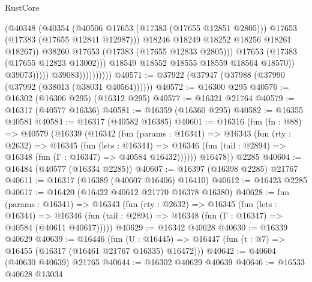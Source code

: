 \begin{lexlean}{RustCore}
\begin{coremodule}
                                            (@40348
                                              (@40354
                                                (@40506 @17653 (@17383 (@17655 @12851 @2805)))
                                                @17653
                                                (@17383 (@17655 @12841 @12987)))
                                              @18246
                                              @18249
                                              @18252
                                              @18256
                                              @18261
                                              @18267))
                                          @38260
                                          @17653
                                          (@17383 (@17655 @12833 @2805)))
                                        @17653
                                        (@17383 (@17655 @12823 @13002)))
                                      @18549
                                      @18552
                                      @18555
                                      @18559
                                      @18564
                                      @18570))
                                  @39073)))))
                        @39083))))))))))
@40571 := @37922 (@37947 (@37988 (@37990 (@37992 (@38013 (@38031 @40564))))))
@40572 := @16300 @295
@40576 := @16302 (@16306 @295) (@16312 @295)
@40577 := @16321 @21764
@40579 := @16317 (@40577 @16336)
@40581 := @16359 (@16360 @295)
@40582 := @16355 @40581
@40584 := @16317 (@40582 @16385)
@40601 := @16316
    (fun (fn : @88) =>
    @40579
      (@16339
        (@16342
          (fun (params : @16341) =>
          @16343
            (fun (rty : @2632) =>
            @16345
              (fun (lets : @16344) =>
              @16346 (fun (tail : @2894) => @16348 (fun (Γ : @16347) => @40584 @16432))))))
        @16478))
    @2285
@40604 := @16484 (@40577 (@16334 @2285))
@40607 := @16397 (@16398 @2285) @21767
@40611 := @16317 (@16389 (@40607 @16406) @16410)
@40612 := @16423 @2285
@40617 := @16420 (@16422 @40612 @21770 @16378 @16380)
@40628 := fun (params : @16341) =>
  @16343
    (fun (rty : @2632) =>
    @16345
      (fun (lets : @16344) =>
      @16346 (fun (tail : @2894) => @16348 (fun (Γ : @16347) => @40584 (@40611 @40617)))))
@40629 := @16342 @40628
@40630 := @16339 @40629
@40639 := @16446
    (fun (U : @16445) => @16447 (fun (t : @7) => @16455 (@16317 (@16461 @21767 @16335) @16472)))
@40642 := @40604 (@40630 @40639) @21765
@40644 := @16302 @40629 @40639
@40646 := @16533 @40628 @13034

\end{coremodule}
\end{lexlean}

